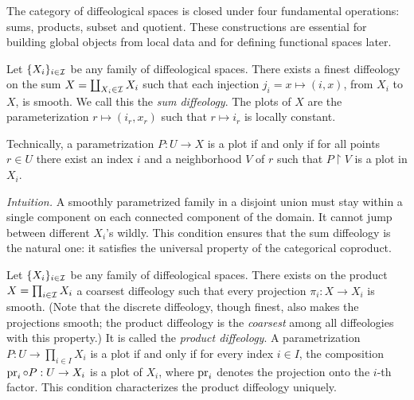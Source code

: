 \documentclass[10pt,reqno,letterpaper,twoside]{amsbook}
\begin{document}
  The category of diffeological spaces is closed under four fundamental operations:
  sums,
  products, subset and quotient.
  These constructions are essential for building global objects from
  local data and for defining functional spaces later.
  
  \begin{article}
    \label{subsec:sums}
    Let $\{X_i\}_{i \in \mathcal{I}}$ be any family of diffeological spaces.
    There exists a finest diffeology on the sum $X = \coprod_{X_i \in \mathcal{I}} X_i$ such that each injection $j_i = x \mapsto (i,x)$,
    from $X_i$ to $X$,
    is smooth.
    We call this the \emph{sum diffeology}.
    The plots of $X$ are the parameterization $r \mapsto (i_r,x_r)$ such that $r \mapsto i_r$ is locally constant.
    
    Technically,
    a parametrization $P : U \to X$ is a plot if and only if for all points $r \in U$ there exist an index $i$ and a neighborhood $V$ of $r$ such that $P \restriction V$ is a plot in $X_i$.
    
    \noindent
    \textit{Intuition.} A smoothly parametrized family in a disjoint union
    must stay within a single component on each connected component of the domain.
    It cannot jump between different $X_i$'s wildly.
    This condition ensures that the sum diffeology is the natural one:
    it satisfies the universal property of the categorical coproduct.
  \end{article}
  
  \begin{article}
    \label{subsec:product}
    Let $\{X_i\}_{i \in \mathcal{I}}$ be any family of diffeological spaces.
    There exists on the product $X = \prod_{i \in \mathcal{I}} X_i$ a coarsest diffeology such that every projection $\pi_i \colon X \to X_i$ is smooth.
    (Note that the discrete diffeology,
    though finest,
    also makes the projections smooth;
    the product diffeology is the \emph{coarsest} among all diffeologies with this property.)
    It is called the \emph{product diffeology}.
    A parametrization $P: U \to \prod_{i\in I} X_i$ is a plot if and only if
    for every index $i\in I$, the composition
    $\pr_i \circ P : U \to X_i$ is a plot of $X_i$,
    where $\pr_i$ denotes the projection onto the $i$-th factor.
    This condition characterizes the product diffeology uniquely.
  \end{article}
  
\end{document}

